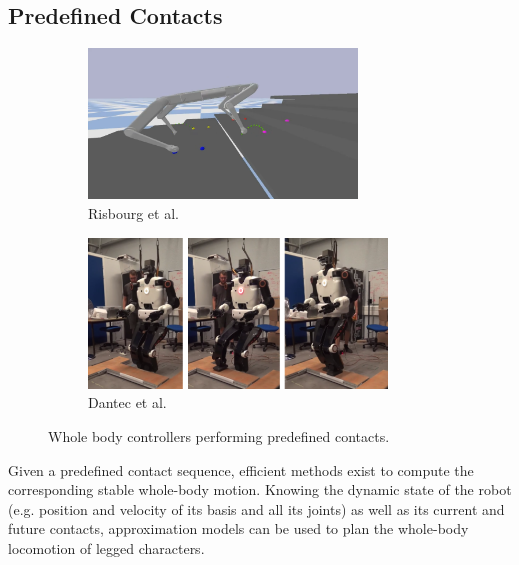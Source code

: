 \subsection{Predefined Contacts}
\begin{figure}[h]
    \centering
    \captionsetup[subfigure]{justification=centering}
    \begin{subfigure}[t]{0.4\linewidth}
    \includegraphics[width=\textwidth,height=4cm]{Figures/Chapter_SOTA//fanny_corbere_solo.png}
    \caption{Risbourg et al. \cite{fanny_mip_solo}}
    \label{fig:mpc_predefined_0}
    \end{subfigure}
    \begin{subfigure}[t]{0.58\linewidth}
    \includegraphics[width=\textwidth,height=4cm]{Figures/Chapter_SOTA//talos_ewen.png}
    \caption{Dantec et al. \cite{ewen_2022}}
    \label{fig:mpc_predefined_1}
    \end{subfigure}
    \label{fig:mpc_predefined}
    \caption{Whole body controllers performing predefined contacts.}
\end{figure}
Given a predefined contact sequence, efficient methods exist to compute the corresponding stable whole-body motion.
Knowing the dynamic state of the robot (e.g. position and velocity of its basis and all its joints) as well as its current and future contacts, approximation models can be used to plan the whole-body locomotion of legged characters.

